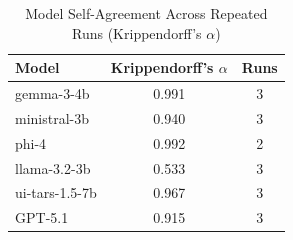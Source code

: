 \begin{table}[htbp]
  \centering
  \caption{Model Self-Agreement Across Repeated Runs (Krippendorff's $\alpha$)}
  \label{tab:self-agreement-krippendorff}
  \begin{tabular}{lcc}
    \toprule
    Model & Krippendorff's $\alpha$ & Runs \\
    \midrule
    gemma-3-4b & 0.991 & 3 \\
    ministral-3b & 0.940 & 3 \\
    phi-4 & 0.992 & 2 \\
    llama-3.2-3b & 0.533 & 3 \\
    ui-tars-1.5-7b & 0.967 & 3 \\
    GPT-5.1 & 0.915 & 3 \\
    \bottomrule
  \end{tabular}
\end{table}